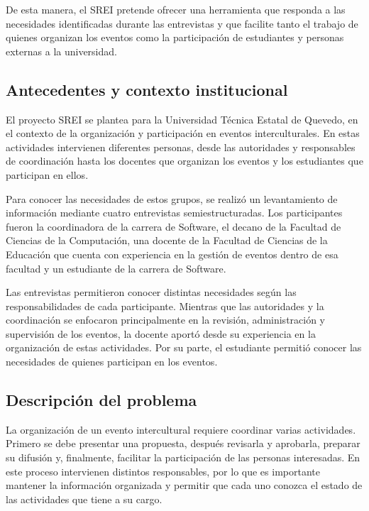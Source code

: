 De esta manera, el SREI pretende ofrecer una herramienta que responda a las necesidades identificadas durante las entrevistas y que facilite tanto el trabajo de quienes organizan los eventos como la participación de estudiantes y personas externas a la universidad.

\subsection{Antecedentes y contexto institucional}

El proyecto SREI se plantea para la Universidad Técnica Estatal de Quevedo, en el contexto de la organización y participación en eventos interculturales. En estas actividades intervienen diferentes personas, desde las autoridades y responsables de coordinación hasta los docentes que organizan los eventos y los estudiantes que participan en ellos.

Para conocer las necesidades de estos grupos, se realizó un levantamiento de información mediante cuatro entrevistas semiestructuradas. Los participantes fueron la coordinadora de la carrera de Software, el decano de la Facultad de Ciencias de la Computación, una docente de la Facultad de Ciencias de la Educación que cuenta con experiencia en la gestión de eventos dentro de esa facultad y un estudiante de la carrera de Software.

Las entrevistas permitieron conocer distintas necesidades según las responsabilidades de cada participante. Mientras que las autoridades y la coordinación se enfocaron principalmente en la revisión, administración y supervisión de los eventos, la docente aportó desde su experiencia en la organización de estas actividades. Por su parte, el estudiante permitió conocer las necesidades de quienes participan en los eventos.

\subsection{Descripción del problema}

La organización de un evento intercultural requiere coordinar varias actividades. Primero se debe presentar una propuesta, después revisarla y aprobarla, preparar su difusión y, finalmente, facilitar la participación de las personas interesadas. En este proceso intervienen distintos responsables, por lo que es importante mantener la información organizada y permitir que cada uno conozca el estado de las actividades que tiene a su cargo.

